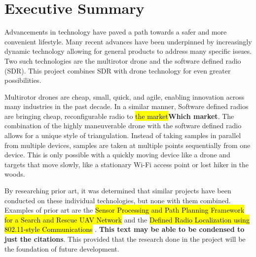 \chapter*{Executive Summary}
Advancements in technology have paved a path towards a safer and more convenient lifestyle. Many recent advances have been underpinned by increasingly dynamic technology allowing for general products to address many specific issues. Two such technologies are the multirotor drone and the software defined radio (SDR). This project combines SDR with drone technology for even greater possibilities. \par

Multirotor drones are cheap, small, quick, and agile, enabling innovation across many industries in the past decade. In a similar manner, Software defined radios are bringing cheap, reconfigurable radio to \hl{the market}\textbf{Which market}. The combination of the highly maneuverable drone with the software defined radio allows for a unique style of triangulation. Instead of taking samples in parallel from multiple devices, samples are taken at multiple points sequentially from one device. This is only possible with a quickly moving device like a drone and targets that move slowly, like a stationary Wi-Fi access point or lost hiker in the woods. \par

By researching prior art, it was determined that similar projects have been conducted on these individual technologies, but none with them combined. Examples of prior art are the \hl{Sensor Processing and Path Planning Framework for a Search and Rescue UAV Network} \cite{path_planning_snr_mqp} and the \hl{Defined Radio Localization using 802.11-style Communications} \cite{sdr_localization_mqp}. \textbf{This text may be able to be condensed to just the citations}. This provided that the research done in the project will be the foundation of future development. \par

